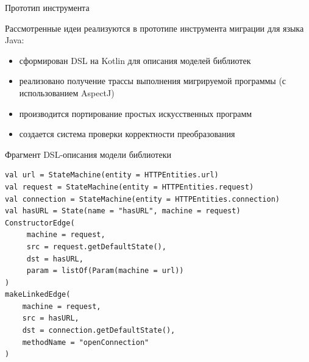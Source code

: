 \documentclass[12pt]{beamer}
\begin{document}

{
\begin{frame}{Прототип инструмента}
  \begin{mybox}[]
  Рассмотренные идеи реализуются в прототипе инструмента миграции для языка Java:
  \begin{itemize}
  	\item сформирован DSL на Kotlin для описания моделей библиотек
  	\item реализовано получение трассы выполнения мигрируемой программы (с использованием AspectJ)
  	\item производится портирование простых искусственных программ
  	\item создается система проверки корректности преобразования
  \end{itemize}
  \end{mybox}
\end{frame}
}

\begin{frame}[fragile]{Фрагмент DSL-описания модели библиотеки}
\begin{verbatim}
val url = StateMachine(entity = HTTPEntities.url)
val request = StateMachine(entity = HTTPEntities.request)
val connection = StateMachine(entity = HTTPEntities.connection)
val hasURL = State(name = "hasURL", machine = request)
ConstructorEdge(
     machine = request,
     src = request.getDefaultState(),
     dst = hasURL,
     param = listOf(Param(machine = url))
)
makeLinkedEdge(
    machine = request,
    src = hasURL,
    dst = connection.getDefaultState(),
    methodName = "openConnection"
)
\end{verbatim}
\end{frame}
\end{document}
